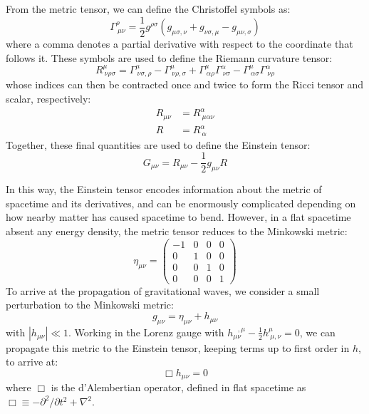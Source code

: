 \begin{refsection}
From the metric tensor, we can define the Christoffel symbols as:
\begin{equation}
    \Gamma^\rho_{\ \mu\nu} = \frac{1}{2} g^{\rho\sigma} (g_{\mu\sigma,\nu} + g_{\nu\sigma,\mu} - g_{\mu\nu,\sigma})
\end{equation}
where a comma denotes a partial derivative with respect to the coordinate that follows it.
These symbols are used to define the Riemann curvature tensor:
\begin{equation}
    R^\mu_{\ \nu\rho\sigma} = \Gamma^\mu_{\ \nu\sigma,\rho} - \Gamma^\mu_{\ \nu\rho,\sigma} + \Gamma^\mu_{\ \alpha\rho}\Gamma^\alpha_{\ \nu\sigma} - \Gamma^\mu_{\ \alpha\sigma}\Gamma^\alpha_{\ \nu\rho}
\end{equation}
whose indices can then be contracted once and twice to form the Ricci tensor and scalar, respectively:
\begin{align}
    R_{\mu\nu} & = R^\alpha_{\ \mu\alpha\nu} \\
    R & = R^{\alpha}_{\ \alpha}
\end{align}
Together, these final quantities are used to define the Einstein tensor:
\begin{equation}
    G_{\mu\nu} = R_{\mu\nu} - \frac{1}{2}g_{\mu\nu} R
\end{equation}

In this way, the Einstein tensor encodes information about the metric of spacetime and its derivatives, and can be enormously complicated depending on how nearby matter has caused spacetime to bend.
However, in a flat spacetime absent any energy density, the metric tensor reduces to the Minkowski metric:
\begin{equation}
   \eta_{\mu\nu} =
   \begin{pmatrix}
        -1 & 0 & 0 & 0 \\
        0 & 1 & 0 & 0 \\
        0 & 0 & 1 & 0 \\
        0 & 0 & 0 & 1
    \end{pmatrix}
\end{equation}
To arrive at the propagation of gravitational waves, we consider a small perturbation to the Minkowski metric:
\begin{equation}
    g_{\mu\nu} = \eta_{\mu\nu} + h_{\mu\nu}
\end{equation}
with $| h_{\mu\nu} | \ll 1$.
Working in the Lorenz gauge with $h_{\mu\nu}^{\ \ \ ,\mu} - \frac{1}{2} h^\mu_{\ \mu,\nu} = 0$, we can propagate this metric to the Einstein tensor, keeping terms up to first order in $h$, to arrive at:
\begin{equation}
    \Box h_{\mu\nu} = 0
\end{equation}
where $\Box$ is the d'Alembertian operator, defined in flat spacetime as $\Box \equiv -\partial^2 / \partial t^2 + \nabla^2$.


\end{refsection}
